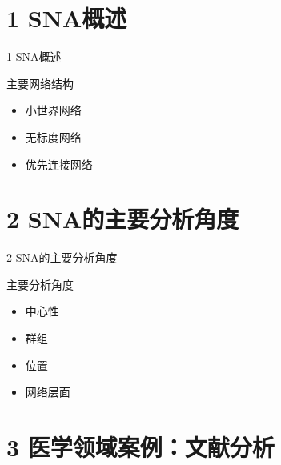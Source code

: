 \documentclass[11pt]{beamer}
\begin{document}
\begin{CJK}{UTF8}{gbsn}
\section{1 SNA概述}

\begin{frame}[plain]

\begin{center}
	\Huge 1 SNA概述
\end{center}

\end{frame}

\begin{frame}{主要网络结构}
\begin{itemize}
	\item 小世界网络
	\item 无标度网络
	\item 优先连接网络
\end{itemize}

\end{frame}


\section{2 SNA的主要分析角度}

\begin{frame}[plain]

\begin{center}
	\Huge 2 SNA的主要分析角度
\end{center}

\end{frame}


\begin{frame}{主要分析角度}

\begin{itemize}
	\item 中心性
	\item 群组
	\item 位置
	\item 网络层面
\end{itemize}

\end{frame}

\section{3 医学领域案例：文献分析}


\end{CJK}
\end{document}
